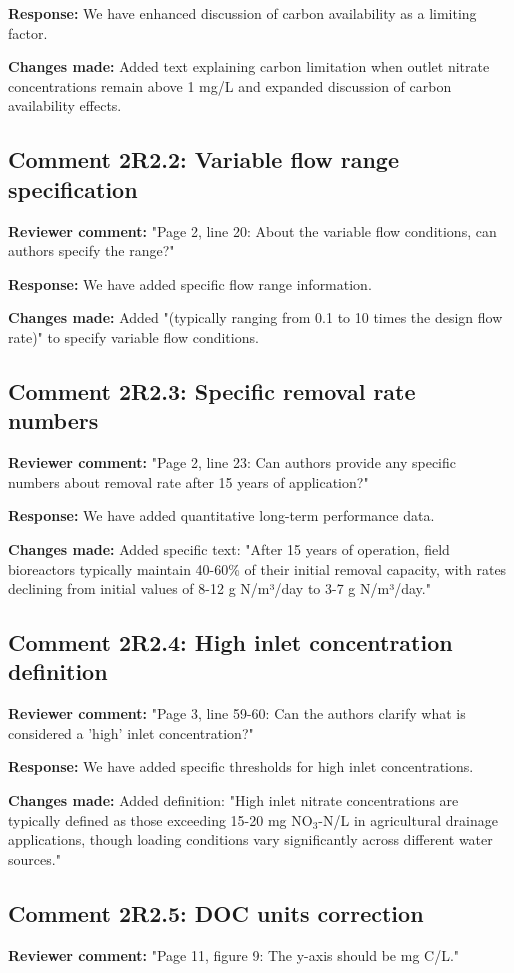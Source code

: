 \documentclass[12pt,a4paper]{article}
\begin{document}
\textbf{Response:} We have enhanced discussion of carbon availability as a limiting factor.

\textbf{Changes made:} Added text explaining carbon limitation when outlet nitrate concentrations remain above 1 mg/L and expanded discussion of carbon availability effects.

\subsection{Comment 2R2.2: Variable flow range specification}
\textbf{Reviewer comment:} "Page 2, line 20: About the variable flow conditions, can authors specify the range?"

\textbf{Response:} We have added specific flow range information.

\textbf{Changes made:} Added "(typically ranging from 0.1 to 10 times the design flow rate)" to specify variable flow conditions.

\subsection{Comment 2R2.3: Specific removal rate numbers}
\textbf{Reviewer comment:} "Page 2, line 23: Can authors provide any specific numbers about removal rate after 15 years of application?"

\textbf{Response:} We have added quantitative long-term performance data.

\textbf{Changes made:} Added specific text: "After 15 years of operation, field bioreactors typically maintain 40-60\% of their initial removal capacity, with rates declining from initial values of 8-12 g N/m³/day to 3-7 g N/m³/day."

\subsection{Comment 2R2.4: High inlet concentration definition}
\textbf{Reviewer comment:} "Page 3, line 59-60: Can the authors clarify what is considered a 'high' inlet concentration?"

\textbf{Response:} We have added specific thresholds for high inlet concentrations.

\textbf{Changes made:} Added definition: "High inlet nitrate concentrations are typically defined as those exceeding 15-20 mg NO$_3$-N/L in agricultural drainage applications, though loading conditions vary significantly across different water sources."

\subsection{Comment 2R2.5: DOC units correction}
\textbf{Reviewer comment:} "Page 11, figure 9: The y-axis should be mg C/L."
\end{document}

